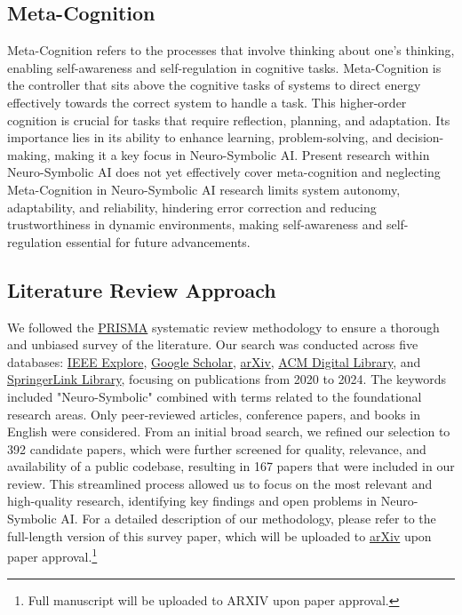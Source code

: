 \documentclass[hf]{ceurart}
\begin{document}
\subsection{Meta-Cognition}\label{subsec:method_meta}
Meta-Cognition refers to the processes that involve thinking about one's thinking, enabling self-awareness and self-regulation in cognitive tasks. Meta-Cognition is the controller that sits above the cognitive tasks of systems to direct energy effectively towards the correct system to handle a task. This higher-order cognition is crucial for tasks that require reflection, planning, and adaptation. Its importance lies in its ability to enhance learning, problem-solving, and decision-making, making it a key focus in Neuro-Symbolic AI. Present research within Neuro-Symbolic AI does not yet effectively cover meta-cognition and neglecting Meta-Cognition in Neuro-Symbolic AI research limits system autonomy, adaptability, and reliability, hindering error correction and reducing trustworthiness in dynamic environments, making self-awareness and self-regulation essential for future advancements.



\subsection{Literature Review Approach}

We followed the \href{https://www.prisma-statement.org/}{PRISMA} systematic review methodology to ensure a thorough and unbiased survey of the literature. Our search was conducted across five databases: \href{https://ieeexplore.ieee.org/Xplore/home.jsp}{IEEE Explore}, \href{http://scholar.google.com}{Google Scholar}, \href{https://arxiv.org/}{arXiv}, \href{http://portal.acm.org/portal.cfm}{ACM Digital Library}, and \href{http://www.springerlink.com}{SpringerLink Library}, focusing on publications from 2020 to 2024. The keywords included "Neuro-Symbolic" combined with terms related to the foundational research areas. Only peer-reviewed articles, conference papers, and books in English were considered. From an initial broad search, we refined our selection to 392 candidate papers, which were further screened for quality, relevance, and availability of a public codebase, resulting in 167 papers that were included in our review. This streamlined process allowed us to focus on the most relevant and high-quality research, identifying key findings and open problems in Neuro-Symbolic AI. For a detailed description of our methodology, please refer to the full-length version of this survey paper, which will be uploaded to \href{http://arxiv.org}{arXiv} upon paper approval.\footnote{Full manuscript will be uploaded to ARXIV upon paper approval.}
\end{document}
